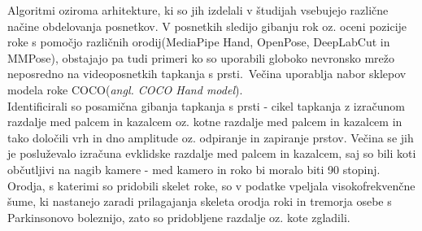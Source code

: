 \documentclass[a4paper,12pt]{article}  %
\begin{document}
Algoritmi oziroma arhitekture, ki so jih izdelali v študijah vsebujejo različne načine obdelovanja posnetkov. V 
posnetkih sledijo gibanju rok oz. oceni pozicije roke s pomočjo različnih orodij(MediaPipe Hand, OpenPose, 
DeepLabCut in MMPose), obstajajo pa tudi primeri ko so uporabili globoko nevronsko mrežo neposredno na 
videoposnetkih tapkanja s prsti.\
Večina uporablja nabor sklepov modela roke COCO(\textit{angl. COCO Hand model}). \\

Identificirali so posamična gibanja tapkanja s prsti - cikel tapkanja z izračunom razdalje med palcem in 
kazalcem oz. kotne razdalje med palcem in kazalcem in tako določili vrh in dno amplitude oz. odpiranje in 
zapiranje prstov. Večina se jih je posluževalo izračuna evklidske razdalje med palcem in kazalcem, saj so 
bili koti občutljivi na nagib kamere - med kamero in roko bi moralo biti 90 stopinj. Orodja, s katerimi so 
pridobili skelet roke, so v podatke vpeljala visokofrekvenčne šume, ki nastanejo zaradi prilagajanja skeleta 
orodja roki in tremorja osebe s Parkinsonovo boleznijo, zato so pridobljene razdalje oz. kote zgladili. \\
\end{document}
